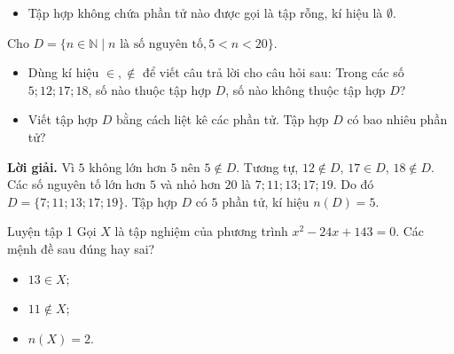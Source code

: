 \begin{kienthuc}
\begin{itemize}
		\item Tập hợp không chứa phần tử nào được gọi là tập rỗng, kí hiệu là $\emptyset$.
	\end{itemize}
	\begin{vd}
		Cho $D = \{n \in \mathbb{N} \mid n \text{ là số nguyên tố}, 5 < n < 20\}$.
		\begin{itemize}
			\item[a)] Dùng kí hiệu $\in, \notin$ để viết câu trả lời cho câu hỏi sau: Trong các số $5; 12; 17; 18$, số nào thuộc tập hợp $D$, số nào không thuộc tập hợp $D$?
			\item[b)] Viết tập hợp $D$ bằng cách liệt kê các phần tử. Tập hợp $D$ có bao nhiêu phần tử?
		\end{itemize}
		\textbf{Lời giải.}
		Vì $5$ không lớn hơn $5$ nên $5 \notin D$. Tương tự, $12 \notin D$, $17 \in D$, $18 \notin D$. Các số nguyên tố lớn hơn $5$ và nhỏ hơn $20$ là $7; 11; 13; 17; 19$. Do đó $D = \{7; 11; 13; 17; 19\}$. Tập hợp $D$ có $5$ phần tử, kí hiệu $n(D) = 5$.
	\end{vd}
	\begin{hoatdong}{Luyện tập 1}
		Gọi $X$ là tập nghiệm của phương trình $x^2 - 24x + 143 = 0$. Các mệnh đề sau đúng hay sai?
		\begin{itemize}
			\item[a)] $13 \in X$;
			\item[b)] $11 \notin X$;
			\item[c)] $n(X) = 2$.
		\end{itemize}
	\end{hoatdong}


\end{kienthuc}

